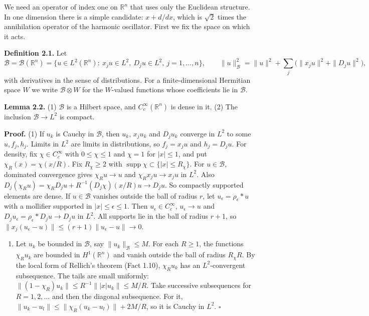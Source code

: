 \documentclass[
  11pt,
]{article}
\providecommand{\tightlist}{%
  \setlength{\itemsep}{0pt}\setlength{\parskip}{0pt}}
\begin{document}
We need an operator of index one on \(\mathbb R^n\) that uses only the
Euclidean structure. In one dimension there is a simple candidate:
\(x+d/dx\), which is \(\sqrt2\) times the annihilation operator of the
harmonic oscillator. First we fix the space on which it acts.

\textbf{Definition 2.1.} Let {\small
\[
\mathcal B=\mathcal B(\mathbb R^n)=\{u\in L^2(\mathbb R^n):\ x_ju\in L^2,\ D_ju\in L^2,\ j=1,\dots,n\},
\qquad
\|u\|_{\mathcal B}^2=\|u\|^2+\sum_j\bigl(\|x_ju\|^2+\|D_ju\|^2\bigr),
\tag{2.1}
\]
} with derivatives in the sense of distributions. For a
finite-dimensional Hermitian space \(W\) we write
\(\mathcal B\otimes W\) for the \(W\)-valued functions whose
coefficients lie in \(\mathcal B\).

\textbf{Lemma 2.2.} (1) \(\mathcal B\) is a Hilbert space, and
\(C_c^\infty(\mathbb R^n)\) is dense in it. (2) The inclusion
\(\mathcal B\to L^2\) is compact.

\textbf{Proof.} (1) If \(u_k\) is Cauchy in \(\mathcal B\), then
\(u_k\), \(x_ju_k\) and \(D_ju_k\) converge in \(L^2\) to some
\(u,f_j,h_j\). Limits in \(L^2\) are limits in distributions, so
\(f_j=x_ju\) and \(h_j=D_ju\). For density, fix \(\chi\in C_c^\infty\)
with \(0\le\chi\le1\) and \(\chi=1\) for \(|x|\le1\), and put
\(\chi_R(x)=\chi(x/R)\). Fix \(R_\chi\ge2\) with
\(\operatorname{supp}\chi\subset\{|x|\le R_\chi\}\). For
\(u\in\mathcal B\), dominated convergence gives \(\chi_Ru\to u\) and
\(\chi_Rx_ju\to x_ju\) in \(L^2\). Also
\(D_j(\chi_Ru)=\chi_RD_ju+R^{-1}(D_j\chi)(x/R)u\to D_ju\). So compactly
supported elements are dense. If \(u\in\mathcal B\) vanishes outside the
ball of radius \(r\), let \(u_\epsilon=\rho_\epsilon*u\) with a
mollifier supported in \(|x|\le\epsilon\le1\). Then
\(u_\epsilon\in C_c^\infty\), \(u_\epsilon\to u\) and
\(D_ju_\epsilon=\rho_\epsilon*D_ju\to D_ju\) in \(L^2\). All supports
lie in the ball of radius \(r+1\), so
\(\|x_j(u_\epsilon-u)\|\le(r+1)\|u_\epsilon-u\|\to0\).

\begin{enumerate}
\def\labelenumi{(\arabic{enumi})}
\setcounter{enumi}{1}
\tightlist
\item
  Let \(u_k\) be bounded in \(\mathcal B\), say
  \(\|u_k\|_{\mathcal B}\le M\). For each \(R\ge1\), the functions
  \(\chi_Ru_k\) are bounded in \(H^1(\mathbb R^n)\) and vanish outside
  the ball of radius \(R_\chi R\). By the local form of Rellich's
  theorem (Fact 1.10), \(\chi_Ru_k\) has an \(L^2\)-convergent
  subsequence. The tails are small uniformly:
  \(\|(1-\chi_R)u_k\|\le R^{-1}\||x|u_k\|\le M/R\). Take successive
  subsequences for \(R=1,2,\dots\) and then the diagonal subsequence.
  For it, \(\|u_k-u_l\|\le\|\chi_R(u_k-u_l)\|+2M/R\), so it is Cauchy in
  \(L^2\). \(\square\)
\end{enumerate}
\end{document}
